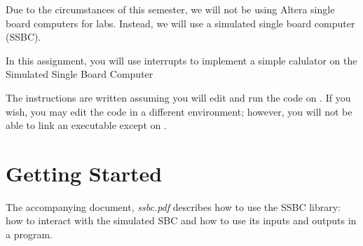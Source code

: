

\usepackage{enumitem}
\usepackage{graphicx}
\usepackage{media9}
\usepackage{addfont}

\renewcommand{\labnumber}{9c}
\renewcommand{\labname}{Using Interrupts to Detect Inputs on Simulated Hardware}
\renewcommand{\shortlabname}{ssbclab-interrupts}
\renewcommand{\collaborationrules}{\individualeffort}
\renewcommand{\duedate}{Week of April 26, before the start of your lab section}
\startdocument


Due to the circumstances of this semester, we will not be using Altera
single board computers for labs. Instead, we will use a simulated single
board computer (SSBC).

In this assignment, you will use interrupts to implement a simple calulator on the
Simulated Single Board Computer

The instructions are written assuming you will edit and run the code on
\runtimeenvironment. If you wish, you may edit the code in a different
environment; however, you will not be able to link an executable except on
\runtimeenvironment.

\section{Getting Started}

The accompanying document, \textit{ssbc.pdf} describes how to use the SSBC
library: how to interact with the simulated SBC and how to use its inputs and
outputs in a program.

